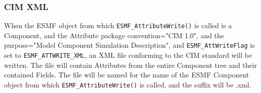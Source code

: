 \subsubsection{CIM XML}

\begin{sloppypar}
When the ESMF object from which {\tt ESMF\_AttributeWrite()} is called is a Component, and the Attribute package convention="CIM 1.0", and the purpose="Model Component Simulation Description", and {\tt ESMF\_AttWriteFlag} is set to {\tt ESMF\_ATTWRITE\_XML}, an XML file conforming to the CIM standard will be written.  The file will contain Attributes from the entire Component tree and their contained Fields.  The file will be named for the name of the ESMF Component object from which {\tt ESMF\_AttributeWrite()} is called, and the suffix will be .xml.
\end{sloppypar}
